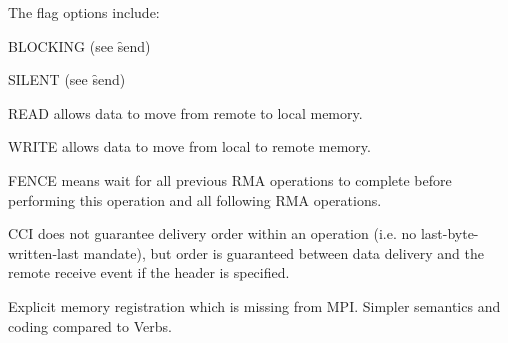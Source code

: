 The flag options include:

\begin{description}
\item BLOCKING (see \f{send})
\item SILENT (see \f{send})
\item READ allows data to move from remote to local memory.
\item WRITE allows data to move from local to remote memory.
\item FENCE means wait for all previous RMA operations to complete before performing this
operation and all following RMA operations.
\end{description}

CCI does not guarantee delivery order within an operation (i.e. no last-byte-written-last
mandate), but order is guaranteed between data delivery and the remote receive event if
the header is specified.

 Explicit memory registration which is missing from MPI. Simpler semantics and coding compared to Verbs.
